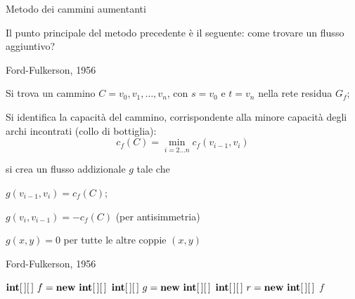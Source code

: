 \begin{frame}{Metodo dei cammini aumentanti}

\vspace{-9pt}
Il punto principale del metodo precedente è il seguente: come trovare un 
flusso aggiuntivo? 

\begin{center}
\end{center}

\end{frame}

\begin{frame}{Ford-Fulkerson, 1956}

\BIL
\item Si trova un cammino $C=v_0,v_1,\ldots,v_n$, con $s=v_0$ e $t=v_n$ 
  nella rete residua $G_f$; 
\item Si identifica la \alert{capacità del cammino}, corrispondente
  alla minore capacità degli archi incontrati (collo di bottiglia):
  \[
    c_f(C) = \min_{i=2 \ldots n} c_f(v_{i-1},v_i)
  \]
\item si crea un flusso addizionale $g$ tale che 
  \BI
  \item $g(v_{i-1}, v_i) = c_f(C)$;
  \item $g(v_i,v_{i-1}) = -c_f(C)$ (per antisimmetria)
  \item $g(x,y)=0$ per tutte le altre coppie $(x,y)$
  \EI
\EIL

\end{frame}

\begin{frame}{Ford-Fulkerson, 1956}

\vspace{-9pt}
\begin{Procedure}
\caption[A]{$\INTARRAY[\,]$ \Flusso(\Graph $G$, \Node $s$, \Node $t$, $\INTARRAY[\,]\ c$)}
$\INTARRAY[\,]\ f = \NEW\ \INTARRAY[\,]$
$\INTARRAY[\,]\ g = \NEW\ \INTARRAY[\,]$
$\INTARRAY[\,]\ r = \NEW\ \INTARRAY[\,]$
\BlankLine
{}
\Return $f$
\end{Procedure}

\end{frame}

